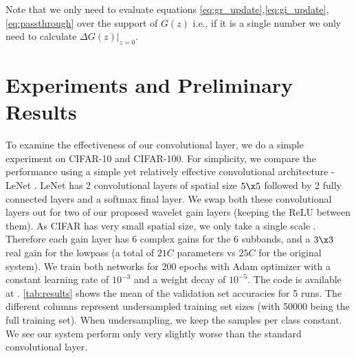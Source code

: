 Note that we only need to evaluate equations
\ref{eq:gr_update},\ref{eq:gi_update},\ref{eq:passthrough} over the support of $G(z)$ 
i.e., if it is a single number we only need to calculate $\left.\Delta G(z)\right\rvert_{z=0}$.

\section{Experiments and Preliminary Results}\label{sec:results}
To examine the effectiveness of our convolutional layer, we do a simple experiment on CIFAR-10 and
CIFAR-100. For simplicity, we compare the performance using a simple yet relatively effective convolutional
architecture - LeNet \cite{lecun_gradient-based_1998}. LeNet has 2 convolutional layers of spatial
size $5\x 5$ followed by
2 fully connected layers and a softmax final layer. We swap both these convolutional
layers out for two of our proposed wavelet gain layers (keeping the ReLU between them). As CIFAR has
very small spatial size, we only take a single scale \DTCWT\@. Therefore each gain layer has $6$ complex gains
for the 6 subbands, and a $3\x 3$ real gain for the lowpass (a total of $21C$ parameters vs $25C$
for the original system). We train both networks for 200 epochs with Adam
\cite{kingma_adam:_2014} optimizer with a constant learning rate of $10^{-3}$ and a weight decay of
$10^{-5}$. The code is available at \cite{cotter_dtcwt_2018}. \autoref{tab:results} shows the
mean of the validation set accuracies for 5 runs. The different columns represent undersampled
training set sizes (with 50000 being the full training set). When undersampling, we keep the samples
per class constant. We see our system perform only very slightly worse than the standard
convolutional layer. 

